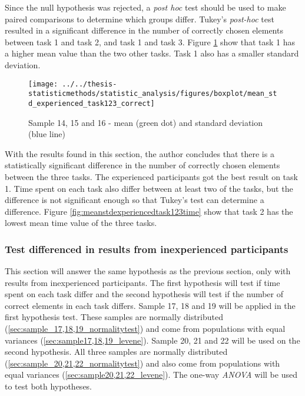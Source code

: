 Since the null hypothesis was rejected, a \textit{post hoc} test should be used to make paired comparisons to determine which groups differ. Tukey's \textit{post-hoc} test resulted in a significant difference in the number of correctly chosen elements between task 1 and task 2, and task 1 and task 3. Figure \ref{fig:meanstdexperiencedtask123correct} show that task 1 has a higher mean value than the two other tasks. Task 1 also has a smaller standard deviation. 

\begin{figure}[H]
	\centering
	\texttt{[image: ../../thesis-statisticmethods/statistic\_analysis/figures/boxplot/mean\_std\_experienced\_task123\_correct]}
	\caption{Sample 14, 15 and 16 - mean (green dot) and standard deviation (blue line)}
	\label{fig:meanstdexperiencedtask123correct}
\end{figure}

\vspace{0.3cm}

With the results found in this section, the author concludes that there is a statistically significant difference in the number of correctly chosen elements between the three tasks. The experienced participants got the best result on task 1. Time spent on each task also differ between at least two of the tasks, but the difference is not significant enough so that Tukey's test can determine a difference. Figure \ref{fig:meanstdexperiencedtask123time} show that task 2 has the lowest mean time value of the three tasks.  


\subsubsection[Sample 17 -  22]{Test differenced in results from inexperienced participants}\label{sec:sample_17_18_19_anova}

This section will answer the same hypothesis as the previous section, only with results from inexperienced participants. The first hypothesis will test if time spent on each task differ and the second hypothesis will test if the number of correct elements in each task differs. Sample 17, 18 and 19 will be applied in the first hypothesis test. These samples are normally distributed (\ref{sec:sample_17,18,19_normalitytest}) and come from populations with equal variances (\ref{sec:sample17,18,19_levene}). Sample 20, 21 and 22 will be used on the second hypothesis. All three samples are normally distributed (\ref{sec:sample_20,21,22_normalitytest}) and also come from populations with equal variances (\ref{sec:sample20,21,22_levene}). The one-way \textit{ANOVA} will be used to test both hypotheses. 

